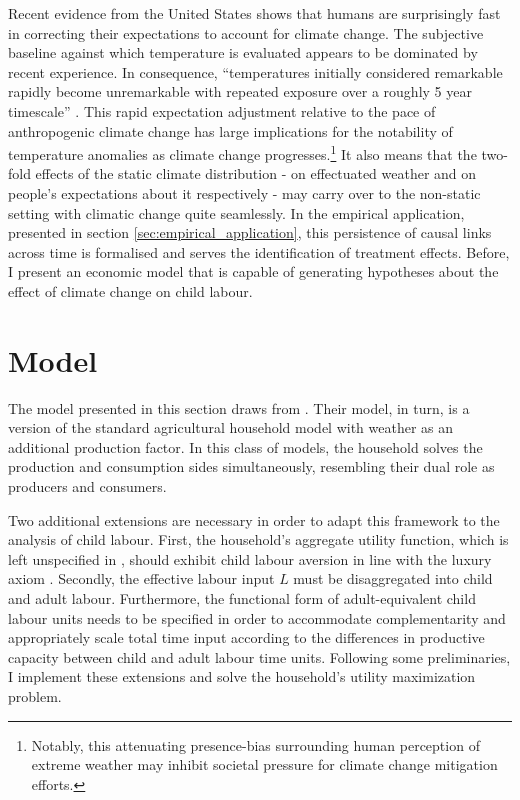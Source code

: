 \documentclass[a4paper,12pt]{article}
\theoremstyle{plain}
\theoremstyle{definition}
\theoremstyle{definition}
\theoremstyle{definition}
\theoremstyle{definition}
\begin{document}
Recent evidence from the United States shows that humans are surprisingly fast in correcting their expectations to account for climate change. The subjective baseline against which temperature is evaluated appears to be dominated by recent experience. In consequence, ``temperatures initially considered remarkable rapidly become unremarkable with repeated exposure over a roughly 5 year timescale'' \citep{Moore2019}. This rapid expectation adjustment relative to the pace of anthropogenic climate change has large implications for the notability of temperature anomalies as climate change progresses.\footnote{Notably, this attenuating presence-bias surrounding human perception of extreme weather may inhibit societal pressure for climate change mitigation efforts.} It also means that the two-fold effects of the static climate distribution - on effectuated weather and on people's expectations about it respectively - may carry over to the non-static setting with climatic change quite seamlessly. In the empirical application, presented in section \ref{sec:empirical_application}, this persistence of causal links across time is formalised and serves the identification of treatment effects. Before, I present an economic model that is capable of generating hypotheses about the effect of climate change on child labour.

\section{Model}
\label{sec:model}

The model presented in this section draws from \citet{Jessoe2018}. Their model, in turn, is a version of the standard agricultural household model \citep{Singgh1986} with weather as an additional production factor. In this class of models, the household solves the production and consumption sides simultaneously, resembling their dual role as producers and consumers.

Two additional extensions are necessary in order to adapt this framework to the analysis of child labour. First, the household's aggregate utility function, which is left unspecified in 
\citet{Jessoe2018}, should exhibit child labour aversion in line with the luxury axiom \citep{Basu1998}. Secondly, the effective labour input $L$ must be disaggregated into child and adult labour. Furthermore, the functional form of adult-equivalent child labour units needs to be specified in order to accommodate complementarity and appropriately scale total time input according to the differences in productive capacity between child and adult labour time units. Following some preliminaries, I implement these extensions and solve the household's utility maximization problem.
\end{document}
